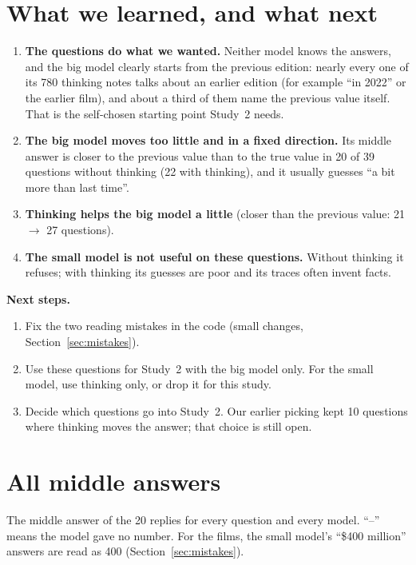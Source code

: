 \documentclass[11pt,a4paper]{article}
\begin{document}
\section{What we learned, and what next}

\begin{enumerate}
  \item \textbf{The questions do what we wanted.} Neither model knows the answers, and the big model clearly starts from the previous edition: nearly every one of its 780 thinking notes talks about an earlier edition (for example ``in 2022'' or the earlier film), and about a third of them name the previous value itself. That is the self-chosen starting point Study~2 needs.
  \item \textbf{The big model moves too little and in a fixed direction.} Its middle answer is closer to the previous value than to the true value in 20 of 39 questions without thinking (22 with thinking), and it usually guesses ``a bit more than last time''.
  \item \textbf{Thinking helps the big model a little} (closer than the previous value: 21 $\rightarrow$ 27 questions).
  \item \textbf{The small model is not useful on these questions.} Without thinking it refuses; with thinking its guesses are poor and its traces often invent facts.
\end{enumerate}

\noindent\textbf{Next steps.}
\begin{enumerate}
  \item Fix the two reading mistakes in the code (small changes, Section~\ref{sec:mistakes}).
  \item Use these questions for Study~2 with the big model only. For the small model, use thinking only, or drop it for this study.
  \item Decide which questions go into Study~2. Our earlier picking kept 10 questions where thinking moves the answer; that choice is still open.
\end{enumerate}

\appendix
\section{All middle answers}

The middle answer of the 20 replies for every question and every model. ``--'' means the model gave no number. For the films, the small model's ``\$400 million'' answers are read as 400 (Section~\ref{sec:mistakes}).
\end{document}
